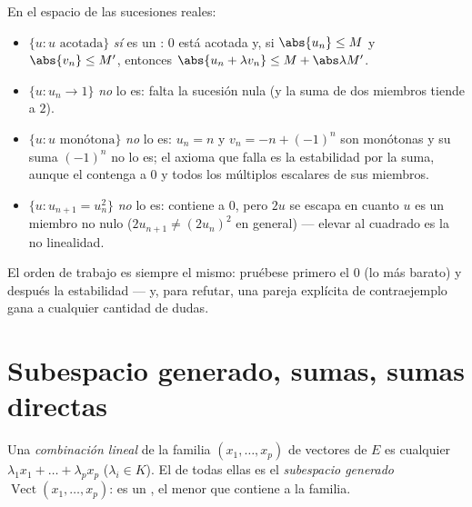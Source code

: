 \begin{example}
\label{ex:b1:vspaces:subspaceornot}
En el espacio de las sucesiones reales:
\begin{itemize}
  \item $\{u : u \text{ acotada}\}$ \emph{sí} es un : $0$
        está acotada y, si $\abs{u_n} \leq M$ y $\abs{v_n} \leq M'$,
        entonces $\abs{u_n + \lambda v_n} \leq M + \abs\lambda M'$.
  \item $\{u : u_n \to 1\}$ \emph{no} lo es: falta la sucesión nula
        (y la suma de dos miembros tiende a $2$).
  \item $\{u : u \text{ monótona}\}$ \emph{no} lo es: $u_n = n$ y
        $v_n = -n + (-1)^n$ son monótonas y su suma $(-1)^n$ no lo
        es; el axioma que falla es la estabilidad por la suma,
        aunque el  contenga a $0$ y todos los múltiplos
        escalares de sus miembros.
  \item $\{u : u_{n+1} = u_n^2\}$ \emph{no} lo es: contiene a $0$,
        pero $2u$ se escapa en cuanto $u$ es un miembro no nulo
        ($2u_{n+1} \neq (2u_n)^2$ en general) --- elevar al cuadrado
        es la no linealidad.
\end{itemize}
El orden de trabajo es siempre el mismo: pruébese primero el $0$ (lo
más barato) y después la estabilidad --- y, para refutar, una pareja
explícita de contraejemplo gana a cualquier cantidad de dudas.
\end{example}

\section{Subespacio generado, sumas, sumas directas}

\begin{definition}\label{def:b1:vspaces:span}
Una \emph{combinación lineal} de la familia $(x_1, \dots, x_p)$ de
vectores de $E$ es cualquier $\lambda_1 x_1 + \dots + \lambda_p x_p$
($\lambda_i \in K$). El  de todas ellas es el
\emph{subespacio generado}
$\operatorname{Vect}(x_1, \dots, x_p)$: es un , el menor
que contiene a la familia.
\end{definition}

